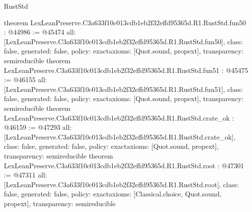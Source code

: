 \begin{lexlean}{RustStd}
\begin{coremodule}
{}
theorem LexLeanPreserve.C3a633f10c013cdb1eb2f32effd95365d.R1.RustStd.fun50 : @44986 := @45474 {
  all: [LexLeanPreserve.C3a633f10c013cdb1eb2f32effd95365d.R1.RustStd.fun50],
  class: false,
  generated: false,
  policy: exact{axioms: [Quot.sound, propext]},
  transparency: semireducible
}
theorem LexLeanPreserve.C3a633f10c013cdb1eb2f32effd95365d.R1.RustStd.fun51 : @45475 := @46155 {
  all: [LexLeanPreserve.C3a633f10c013cdb1eb2f32effd95365d.R1.RustStd.fun51],
  class: false,
  generated: false,
  policy: exact{axioms: [Quot.sound, propext]},
  transparency: semireducible
}
theorem LexLeanPreserve.C3a633f10c013cdb1eb2f32effd95365d.R1.RustStd.crate_ok : @46159 := @47293 {
  all: [LexLeanPreserve.C3a633f10c013cdb1eb2f32effd95365d.R1.RustStd.crate_ok],
  class: false,
  generated: false,
  policy: exact{axioms: [Quot.sound, propext]},
  transparency: semireducible
}
theorem LexLeanPreserve.C3a633f10c013cdb1eb2f32effd95365d.R1.RustStd.root : @47301 := @47311 {
  all: [LexLeanPreserve.C3a633f10c013cdb1eb2f32effd95365d.R1.RustStd.root],
  class: false,
  generated: false,
  policy: exact{axioms: [Classical.choice, Quot.sound, propext]},
  transparency: semireducible
}


\end{coremodule}
\end{lexlean}
